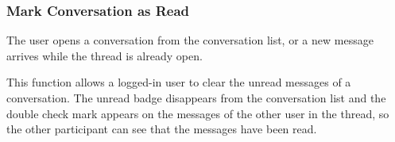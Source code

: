 
\subsubsection{Mark Conversation as Read}

 The user opens a conversation from the conversation list, or a new message arrives while the thread is already open.

 This function allows a logged-in user to clear the unread messages of a conversation. The unread badge disappears from the conversation list and the double check mark appears on the messages of the other user in the thread, so the other participant can see that the messages have been read.



